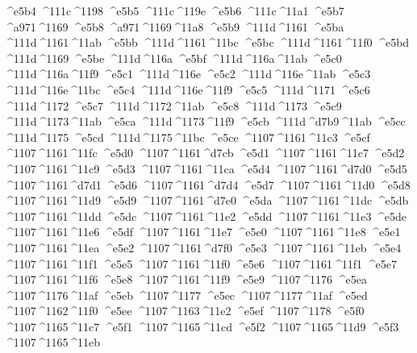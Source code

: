 \checkit ^^^^e5b4 ^^^^111c^^^^1198
\checkit ^^^^e5b5 ^^^^111c^^^^119e
\checkit ^^^^e5b6 ^^^^111c^^^^11a1
\checkit ^^^^e5b7 ^^^^a971^^^^1169
\checkit ^^^^e5b8 ^^^^a971^^^^1169^^^^11a8
\checkit ^^^^e5b9 ^^^^111d^^^^1161
\checkit ^^^^e5ba ^^^^111d^^^^1161^^^^11ab
\checkit ^^^^e5bb ^^^^111d^^^^1161^^^^11bc
\checkit ^^^^e5bc ^^^^111d^^^^1161^^^^11f0
\checkit ^^^^e5bd ^^^^111d^^^^1169
\checkit ^^^^e5be ^^^^111d^^^^116a
\checkit ^^^^e5bf ^^^^111d^^^^116a^^^^11ab
\checkit ^^^^e5c0 ^^^^111d^^^^116a^^^^11f9
\checkit ^^^^e5c1 ^^^^111d^^^^116e
\checkit ^^^^e5c2 ^^^^111d^^^^116e^^^^11ab
\checkit ^^^^e5c3 ^^^^111d^^^^116e^^^^11bc
\checkit ^^^^e5c4 ^^^^111d^^^^116e^^^^11f9
\checkit ^^^^e5c5 ^^^^111d^^^^1171
\checkit ^^^^e5c6 ^^^^111d^^^^1172
\checkit ^^^^e5c7 ^^^^111d^^^^1172^^^^11ab
\checkit ^^^^e5c8 ^^^^111d^^^^1173
\checkit ^^^^e5c9 ^^^^111d^^^^1173^^^^11ab
\checkit ^^^^e5ca ^^^^111d^^^^1173^^^^11f9
\checkit ^^^^e5cb ^^^^111d^^^^d7b9^^^^11ab
\checkit ^^^^e5cc ^^^^111d^^^^1175
\checkit ^^^^e5cd ^^^^111d^^^^1175^^^^11bc
\checkit ^^^^e5ce ^^^^1107^^^^1161^^^^11c3
\checkit ^^^^e5cf ^^^^1107^^^^1161^^^^11fc
\checkit ^^^^e5d0 ^^^^1107^^^^1161^^^^d7cb
\checkit ^^^^e5d1 ^^^^1107^^^^1161^^^^11c7
\checkit ^^^^e5d2 ^^^^1107^^^^1161^^^^11c9
\checkit ^^^^e5d3 ^^^^1107^^^^1161^^^^11ca
\checkit ^^^^e5d4 ^^^^1107^^^^1161^^^^d7d0
\checkit ^^^^e5d5 ^^^^1107^^^^1161^^^^d7d1
\checkit ^^^^e5d6 ^^^^1107^^^^1161^^^^d7d4
\checkit ^^^^e5d7 ^^^^1107^^^^1161^^^^11d0
\checkit ^^^^e5d8 ^^^^1107^^^^1161^^^^11d9
\checkit ^^^^e5d9 ^^^^1107^^^^1161^^^^d7e0
\checkit ^^^^e5da ^^^^1107^^^^1161^^^^11dc
\checkit ^^^^e5db ^^^^1107^^^^1161^^^^11dd
\checkit ^^^^e5dc ^^^^1107^^^^1161^^^^11e2
\checkit ^^^^e5dd ^^^^1107^^^^1161^^^^11e3
\checkit ^^^^e5de ^^^^1107^^^^1161^^^^11e6
\checkit ^^^^e5df ^^^^1107^^^^1161^^^^11e7
\checkit ^^^^e5e0 ^^^^1107^^^^1161^^^^11e8
\checkit ^^^^e5e1 ^^^^1107^^^^1161^^^^11ea
\checkit ^^^^e5e2 ^^^^1107^^^^1161^^^^d7f0
\checkit ^^^^e5e3 ^^^^1107^^^^1161^^^^11eb
\checkit ^^^^e5e4 ^^^^1107^^^^1161^^^^11f1
\checkit ^^^^e5e5 ^^^^1107^^^^1161^^^^11f0
\checkit ^^^^e5e6 ^^^^1107^^^^1161^^^^11f1
\checkit ^^^^e5e7 ^^^^1107^^^^1161^^^^11f6
\checkit ^^^^e5e8 ^^^^1107^^^^1161^^^^11f9
\checkit ^^^^e5e9 ^^^^1107^^^^1176
\checkit ^^^^e5ea ^^^^1107^^^^1176^^^^11af
\checkit ^^^^e5eb ^^^^1107^^^^1177
\checkit ^^^^e5ec ^^^^1107^^^^1177^^^^11af
\checkit ^^^^e5ed ^^^^1107^^^^1162^^^^11f0
\checkit ^^^^e5ee ^^^^1107^^^^1163^^^^11e2
\checkit ^^^^e5ef ^^^^1107^^^^1178
\checkit ^^^^e5f0 ^^^^1107^^^^1165^^^^11c7
\checkit ^^^^e5f1 ^^^^1107^^^^1165^^^^11cd
\checkit ^^^^e5f2 ^^^^1107^^^^1165^^^^11d9
\checkit ^^^^e5f3 ^^^^1107^^^^1165^^^^11eb
